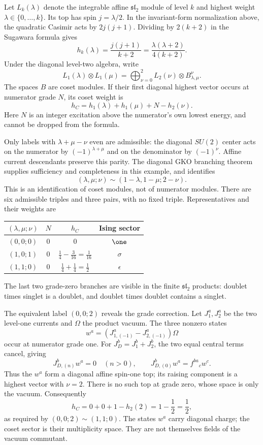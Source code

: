 \begin{example}
\label{ex:voa-Ising-branching}
Let $L_k(\lambda)$ denote the integrable affine
$\mathfrak{sl}_2$ module of level $k$ and highest weight
$\lambda\in\{0,\ldots,k\}$. Its top has spin
$j=\lambda/2$. In the invariant-form normalization above, the
quadratic Casimir acts by $2j(j+1)$. Dividing by $2(k+2)$
in the Sugawara formula gives
\[
 h_k(\lambda)=\frac{j(j+1)}{k+2}
             =\frac{\lambda(\lambda+2)}{4(k+2)}.
\]
Under the diagonal level-two algebra, write
\[
 L_1(\lambda)\otimes L_1(\mu)
 =\bigoplus_{\nu=0}^2 L_2(\nu)\otimes B_{\lambda,\mu}^{\nu}.
\]
The spaces $B$ are coset modules. If their first diagonal
highest vector occurs at numerator grade $N$, its coset weight is
\begin{equation}
 h_C=h_1(\lambda)+h_1(\mu)+N-h_2(\nu).
 \label{eq:voa-coset-grade}
\end{equation}
Here $N$ is an integer excitation above the numerator's own
lowest energy, and cannot be dropped from the formula.

Only labels with $\lambda+\mu-\nu$ even are admissible:
the diagonal $SU(2)$ center acts on the numerator by
$(-1)^{\lambda+\mu}$ and on the denominator by $(-1)^\nu$.
Affine current descendants preserve this parity. The diagonal
GKO branching theorem supplies sufficiency and completeness in
this example, and identifies
\[
 (\lambda,\mu;\nu)\sim(1-\lambda,1-\mu;2-\nu).
\]
This is an identification of coset modules, not of numerator
modules. There are six admissible triples and three pairs, with
no fixed triple. Representatives and their weights are
\begin{center}
\begin{tabular}{c|c|c|c}
$(\lambda,\mu;\nu)$ & $N$ & $h_C$ & Ising sector\\
\hline
$(0,0;0)$ & $0$ & $0$ & $\one$\\
$(1,0;1)$ & $0$ & $\frac14-\frac3{16}=\frac1{16}$ & $\sigma$\\
$(1,1;0)$ & $0$ & $\frac14+\frac14=\frac12$ & $\epsilon$
\end{tabular}
\end{center}
The last two grade-zero branches are visible in the finite
$\mathfrak{sl}_2$ products: doublet times singlet is a doublet,
and doublet times doublet contains a singlet.

The equivalent label $(0,0;2)$ reveals the grade correction.
Let $J_1^a,J_2^a$ be the two level-one currents and $\Omega$
the product vacuum. The three nonzero states
\[
 w^a=(J_{1,(-1)}^a-J_{2,(-1)}^a)\Omega
\]
occur at numerator grade one. For $J_D^b=J_1^b+J_2^b$,
the two equal central terms cancel, giving
\[
 J_{D,(n)}^b w^a=0\quad(n>0),\qquad
 J_{D,(0)}^b w^a=f^{ba}{}_c w^c.
\]
Thus the $w^a$ form a diagonal affine spin-one top; its raising
component is a highest vector with $\nu=2$. There is no such
top at grade zero, whose space is only the vacuum. Consequently
\[
 h_C=0+0+1-h_2(2)=1-\frac12=\frac12,
\]
as required by $(0,0;2)\sim(1,1;0)$. The states $w^a$ carry
diagonal charge; the coset sector is their multiplicity space.
They are not themselves fields of the vacuum commutant.


\end{example}

